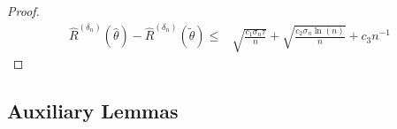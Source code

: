 \begin{proof}
\begin{align*}
   \widehat R^{({\delta_n})}(\widehat\theta) - \widehat R^{({\delta_n})}(\tilde\theta)\leq & \sqrt{\frac{c_1\sigma_n\tau}{n}} + \sqrt{\frac{ c_2\sigma_n\ln(n)}{n}}  + c_3n^{-1}
\end{align*}



\end{proof}




\subsection{Auxiliary Lemmas}

